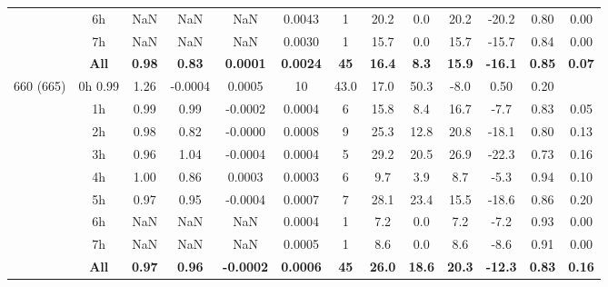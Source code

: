 \documentclass[preview]{standalone}
\begin{document}
\begin{tabular}{ccccccccccccc}
& 6h   & NaN & NaN & NaN & 0.0043 &  1 & 20.2 & 0.0 & 20.2 & -20.2 & 0.80 & 0.00 \\ 
& 7h   & NaN & NaN & NaN & 0.0030 &  1 & 15.7 & 0.0 & 15.7 & -15.7 & 0.84 & 0.00 \\ \cline{2-13}
 & \textbf{All} & \textbf{0.98} & \textbf{0.83} & \textbf{0.0001} & \textbf{0.0024} & \textbf{45} & \textbf{16.4} & \textbf{8.3} & \textbf{15.9} & \textbf{-16.1} & \textbf{0.85} & \textbf{0.07} \\ \hline
\multirow{9}{*}{660 (665)} & 0h  0.99 & 1.26 & -0.0004 & 0.0005 & 10 & 43.0 & 17.0 & 50.3 & -8.0 & 0.50 & 0.20 \\ 
& 1h   & 0.99 & 0.99 & -0.0002 & 0.0004 &  6 & 15.8 & 8.4 & 16.7 & -7.7 & 0.83 & 0.05 \\ 
& 2h   & 0.98 & 0.82 & -0.0000 & 0.0008 &  9 & 25.3 & 12.8 & 20.8 & -18.1 & 0.80 & 0.13 \\ 
& 3h   & 0.96 & 1.04 & -0.0004 & 0.0004 &  5 & 29.2 & 20.5 & 26.9 & -22.3 & 0.73 & 0.16 \\ 
& 4h   & 1.00 & 0.86 & 0.0003 & 0.0003 &  6 & 9.7 & 3.9 & 8.7 & -5.3 & 0.94 & 0.10 \\ 
& 5h   & 0.97 & 0.95 & -0.0004 & 0.0007 &  7 & 28.1 & 23.4 & 15.5 & -18.6 & 0.86 & 0.20 \\ 
& 6h   & NaN & NaN & NaN & 0.0004 &  1 & 7.2 & 0.0 & 7.2 & -7.2 & 0.93 & 0.00 \\ 
& 7h   & NaN & NaN & NaN & 0.0005 &  1 & 8.6 & 0.0 & 8.6 & -8.6 & 0.91 & 0.00 \\ \cline{2-13}
 & \textbf{All} & \textbf{0.97} & \textbf{0.96} & \textbf{-0.0002} & \textbf{0.0006} & \textbf{45} & \textbf{26.0} & \textbf{18.6} & \textbf{20.3} & \textbf{-12.3} & \textbf{0.83} & \textbf{0.16}\\ 
\hline 
\end{tabular}
\end{document}
